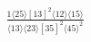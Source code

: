 \documentclass[varwidth, border=5pt]{standalone}
\begin{document}
\begin{my}
$\begin{gathered}
\scriptscriptstyle\frac{1⟨25⟩[13]^2⟨12⟩⟨15⟩}{⟨13⟩⟨23⟩[35]^2⟨45⟩^2}
\end{gathered}$
\end{my}
\end{document}
